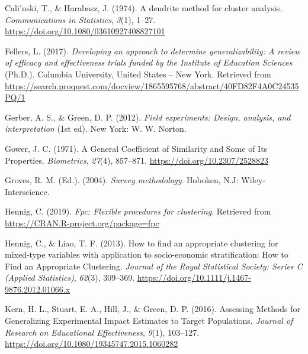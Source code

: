 \documentclass[
  english,
  man,floatsintext]{apa6}
\begin{document}
\begingroup
\setlength{\parindent}{-0.5in}
\setlength{\leftskip}{0.5in}

\hypertarget{refs}{}
\leavevmode\hypertarget{ref-calinskiDendriteMethodCluster1974}{}%
Cali\a'nski, T., \& Harabasz, J. (1974). A dendrite method for cluster analysis. \emph{Communications in Statistics}, \emph{3}(1), 1--27. \url{https://doi.org/10.1080/03610927408827101}

\leavevmode\hypertarget{ref-fellersDevelopingApproachDetermine2017}{}%
Fellers, L. (2017). \emph{Developing an approach to determine generalizability: A review of efficacy and effectiveness trials funded by the Institute of Education Sciences} (Ph.D.). Columbia University, United States -- New York. Retrieved from \url{https://search.proquest.com/docview/1865595768/abstract/40FD82F4A0C24535PQ/1}

\leavevmode\hypertarget{ref-gerberFieldExperimentsDesign2012}{}%
Gerber, A. S., \& Green, D. P. (2012). \emph{Field experiments: Design, analysis, and interpretation} (1st ed). New York: W. W. Norton.

\leavevmode\hypertarget{ref-gowerGeneralCoefficientSimilarity1971}{}%
Gower, J. C. (1971). A General Coefficient of Similarity and Some of Its Properties. \emph{Biometrics}, \emph{27}(4), 857--871. \url{https://doi.org/10.2307/2528823}

\leavevmode\hypertarget{ref-grovesSurveyMethodology2004}{}%
Groves, R. M. (Ed.). (2004). \emph{Survey methodology}. Hoboken, N.J: Wiley-Interscience.

\leavevmode\hypertarget{ref-R-fpc}{}%
Hennig, C. (2019). \emph{Fpc: Flexible procedures for clustering}. Retrieved from \url{https://CRAN.R-project.org/package=fpc}

\leavevmode\hypertarget{ref-hennigHowFindAppropriate2013}{}%
Hennig, C., \& Liao, T. F. (2013). How to find an appropriate clustering for mixed-type variables with application to socio-economic stratification: How to Find an Appropriate Clustering. \emph{Journal of the Royal Statistical Society: Series C (Applied Statistics)}, \emph{62}(3), 309--369. \url{https://doi.org/10.1111/j.1467-9876.2012.01066.x}

\leavevmode\hypertarget{ref-kernAssessingMethodsGeneralizing2016}{}%
Kern, H. L., Stuart, E. A., Hill, J., \& Green, D. P. (2016). Assessing Methods for Generalizing Experimental Impact Estimates to Target Populations. \emph{Journal of Research on Educational Effectiveness}, \emph{9}(1), 103--127. \url{https://doi.org/10.1080/19345747.2015.1060282}
\end{document}
